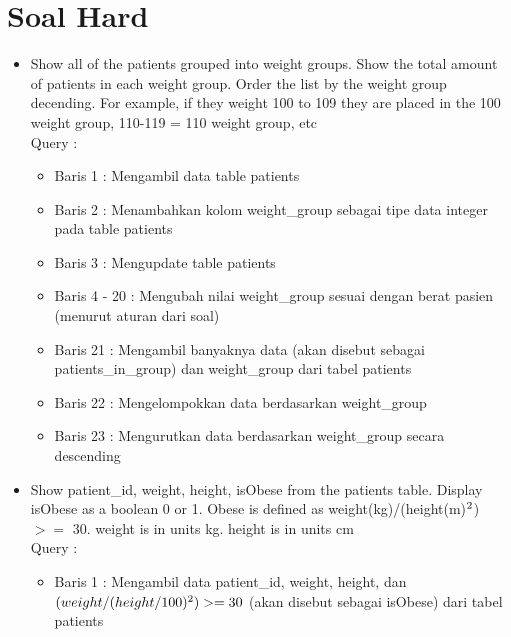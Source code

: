 \documentclass[]{article}
\begin{document}
\section{Soal Hard}
    \begin{itemize}
        \item Show all of the patients grouped into weight groups. Show the total amount of patients in each weight group. Order the list by the weight group decending. For example, if they weight 100 to 109 they are placed in the 100 weight group, 110-119 = 110 weight group, etc
        \\Query :
        
        \begin{itemize}
            \item Baris 1 : Mengambil data table patients
            \item Baris 2 : Menambahkan kolom weight\_group sebagai tipe data integer pada table patients
            \item Baris 3 : Mengupdate table patients
            \item Baris 4 - 20 : Mengubah nilai weight\_group sesuai dengan berat pasien (menurut aturan dari soal)
            \item Baris 21 : Mengambil banyaknya data (akan disebut sebagai patients\_in\_group) dan weight\_group dari tabel patients
            \item Baris 22 : Mengelompokkan data berdasarkan weight\_group
            \item Baris 23 : Mengurutkan data berdasarkan weight\_group secara descending
        \end{itemize}

        \item Show patient\_id, weight, height, isObese from the patients table. Display isObese as a boolean 0 or 1. Obese is defined as weight(kg)/(height(m)$\textsuperscript{2}$) $>=$ 30. weight is in units kg. height is in units cm
        \\Query :
        
        \begin{itemize}
            \item Baris 1 : Mengambil data patient\_id, weight, height, dan
            \\ $(weight/(height/100)\textsuperscript{2}) >= 30$ (akan disebut sebagai isObese) dari tabel patients
        \end{itemize}


\end{itemize}
\end{document}
